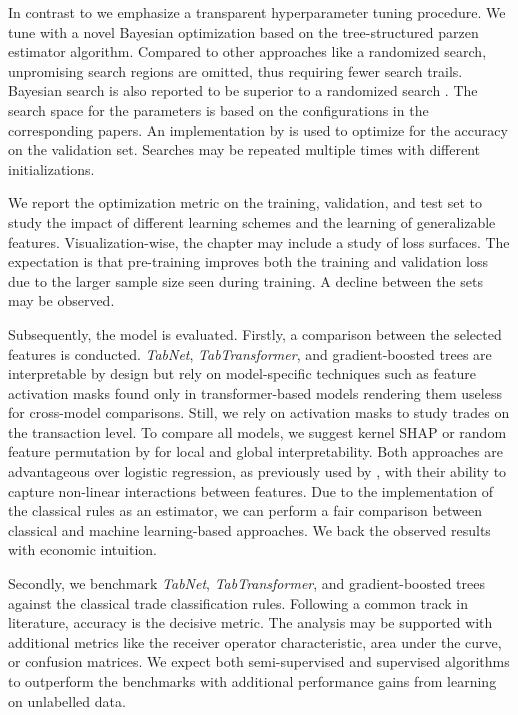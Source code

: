 In contrast to \textcite{ronenMachineLearningTrade2022} we emphasize a transparent hyperparameter tuning procedure. We tune with a novel Bayesian optimization based on the tree-structured parzen estimator algorithm. Compared to other approaches like a randomized search, unpromising search regions are omitted, thus requiring fewer search trails. Bayesian search is also reported to be superior to a randomized search \autocite{turnerBayesianOptimizationSuperior2021}. The search space for the parameters is based on the configurations in the corresponding papers. An implementation by \textcite{akibaOptunaNextgenerationHyperparameter2019} is used to optimize for the accuracy on the validation set. Searches may be repeated multiple times with different initializations.

We report the optimization metric on the training, validation, and test set to study the impact of different learning schemes and the learning of generalizable features. Visualization-wise, the chapter may include a study of loss surfaces. The expectation is that pre-training improves both the training and validation loss due to the larger sample size seen during training. A decline between the sets may be observed.

Subsequently, the model is evaluated. Firstly, a comparison between the selected features is conducted. \textit{TabNet}, \textit{TabTransformer}, and gradient-boosted trees are interpretable by design but rely on model-specific techniques such as feature activation masks found only in transformer-based models rendering them useless for cross-model comparisons. Still, we rely on activation masks to study trades on the transaction level. To compare all models, we suggest kernel \gls{SHAP} \autocite{lundbergUnifiedApproachInterpreting2017} or random feature permutation by \textcite{breimanRandomForests2001} for local and global interpretability. Both approaches are advantageous over logistic regression, as previously used by \textcites{savickasInferringDirectionOption2003}{chakrabartyTradeClassificationAlgorithms2012}, with their ability to capture non-linear interactions between features. Due to the implementation of the classical rules as an estimator, we can perform a fair comparison between classical and machine learning-based approaches. We back the observed results with economic intuition.

Secondly, we benchmark \textit{TabNet}, \textit{TabTransformer}, and gradient-boosted trees against the classical trade classification rules. Following a common track in literature, accuracy is the decisive metric. The analysis may be supported with additional metrics like the receiver operator characteristic, area under the curve, or confusion matrices. We expect both semi-supervised and supervised algorithms to outperform the benchmarks with additional performance gains from learning on unlabelled data.

